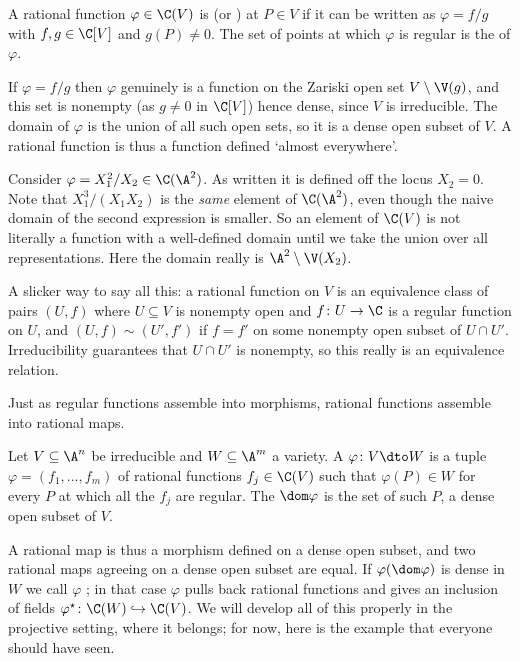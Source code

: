 \begin{definition}
	A rational function $\varphi \in \C(V)$ is  (or ) at $P \in V$ if it can be written as $\varphi = f/g$ with $f,g \in \C[V]$ and $g(P) \neq 0$. The set of points at which $\varphi$ is regular is the  of $\varphi$.
\end{definition}

If $\varphi = f/g$ then $\varphi$ genuinely is a function on the Zariski open set $V \setminus \V(g)$, and this set is nonempty (as $g \neq 0$ in $\C[V]$) hence dense, since $V$ is irreducible. The domain of $\varphi$ is the union of all such open sets, so it is a dense open subset of $V$. A rational function is thus a function defined `almost everywhere'.

\begin{example}
	Consider $\varphi = X_1^2/X_2 \in \C(\A^2)$. As written it is defined off the locus $X_2 = 0$. Note that $X_1^3/(X_1X_2)$ is the \emph{same} element of $\C(\A^2)$, even though the naive domain of the second expression is smaller. So an element of $\C(V)$ is not literally a function with a well-defined domain until we take the union over all representations. Here the domain really is $\A^2 \setminus \V(X_2)$.
\end{example}

\begin{remark}
	A slicker way to say all this: a rational function on $V$ is an equivalence class of pairs $(U,f)$ where $U \subseteq V$ is nonempty open and $f \colon U \to \C$ is a regular function on $U$, and $(U,f) \sim (U',f')$ if $f = f'$ on some nonempty open subset of $U \cap U'$. Irreducibility guarantees that $U \cap U'$ is nonempty, so this really is an equivalence relation.
\end{remark}

Just as regular functions assemble into morphisms, rational functions assemble into rational maps.

\begin{definition}
	Let $V \subseteq \A^n$ be irreducible and $W \subseteq \A^m$ a variety. A  $\varphi \colon V \dto W$ is a tuple $\varphi = (f_1,\dots,f_m)$ of rational functions $f_j \in \C(V)$ such that $\varphi(P) \in W$ for every $P$ at which all the $f_j$ are regular. The  $\dom\varphi$ is the set of such $P$, a dense open subset of $V$.
\end{definition}

A rational map is thus a morphism defined on a dense open subset, and two rational maps agreeing on a dense open subset are equal. If $\varphi(\dom\varphi)$ is dense in $W$ we call $\varphi$ ; in that case $\varphi$ pulls back rational functions and gives an inclusion of fields $\varphi^\star \colon \C(W)\hookrightarrow\C(V)$. We will develop all of this properly in the projective setting, where it belongs; for now, here is the example that everyone should have seen.

